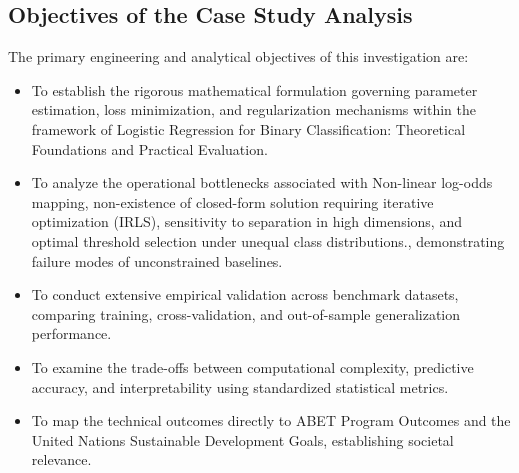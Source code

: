 \subsection{Objectives of the Case Study Analysis}
The primary engineering and analytical objectives of this investigation are:
\begin{itemize}
  \item To establish the rigorous mathematical formulation governing parameter estimation, loss minimization, and regularization mechanisms within the framework of Logistic Regression for Binary Classification: Theoretical Foundations and Practical Evaluation.
  \item To analyze the operational bottlenecks associated with Non-linear log-odds mapping, non-existence of closed-form solution requiring iterative optimization (IRLS), sensitivity to separation in high dimensions, and optimal threshold selection under unequal class distributions., demonstrating failure modes of unconstrained baselines.
  \item To conduct extensive empirical validation across benchmark datasets, comparing training, cross-validation, and out-of-sample generalization performance.
  \item To examine the trade-offs between computational complexity, predictive accuracy, and interpretability using standardized statistical metrics.
  \item To map the technical outcomes directly to ABET Program Outcomes and the United Nations Sustainable Development Goals, establishing societal relevance.
\end{itemize}
